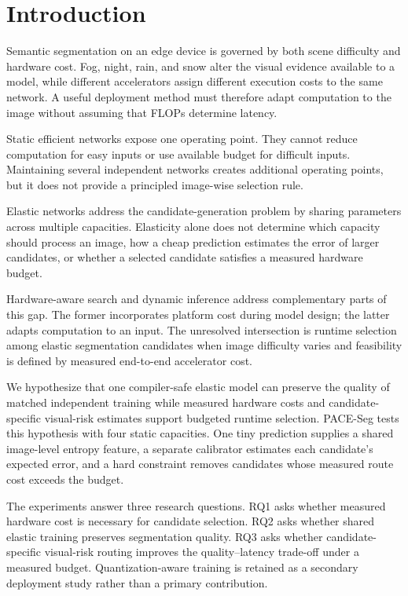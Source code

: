 \documentclass[a4paper,review,12pt]{elsarticle}
\newcommand{\method}{PACE-Seg}
\begin{document}
\section{Introduction}
\label{sec:introduction}

Semantic segmentation on an edge device is governed by both scene difficulty and hardware cost. Fog, night, rain, and snow alter the visual evidence available to a model, while different accelerators assign different execution costs to the same network. A useful deployment method must therefore adapt computation to the image without assuming that FLOPs determine latency.

Static efficient networks expose one operating point. They cannot reduce computation for easy inputs or use available budget for difficult inputs. Maintaining several independent networks creates additional operating points, but it does not provide a principled image-wise selection rule.

Elastic networks address the candidate-generation problem by sharing parameters across multiple capacities. Elasticity alone does not determine which capacity should process an image, how a cheap prediction estimates the error of larger candidates, or whether a selected candidate satisfies a measured hardware budget.

Hardware-aware search and dynamic inference address complementary parts of this gap. The former incorporates platform cost during model design; the latter adapts computation to an input. The unresolved intersection is runtime selection among elastic segmentation candidates when image difficulty varies and feasibility is defined by measured end-to-end accelerator cost.

We hypothesize that one compiler-safe elastic model can preserve the quality of matched independent training while measured hardware costs and candidate-specific visual-risk estimates support budgeted runtime selection. \method{} tests this hypothesis with four static capacities. One tiny prediction supplies a shared image-level entropy feature, a separate calibrator estimates each candidate's expected error, and a hard constraint removes candidates whose measured route cost exceeds the budget.

The experiments answer three research questions. RQ1 asks whether measured hardware cost is necessary for candidate selection. RQ2 asks whether shared elastic training preserves segmentation quality. RQ3 asks whether candidate-specific visual-risk routing improves the quality--latency trade-off under a measured budget. Quantization-aware training is retained as a secondary deployment study rather than a primary contribution.
\end{document}
